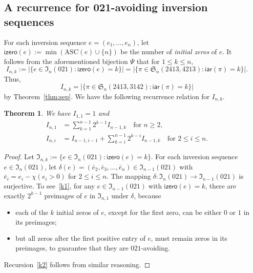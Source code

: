\documentclass[12pt]{amsart}
\numberwithin{equation}{section}
\theoremstyle{plain}
\newtheorem{theorem}{Theorem}[section]
\theoremstyle{definition}
\newcommand{\I}{\mathfrak{I}}
\def\S{\mathfrak{S}}
\def\iar{\mathsf{iar}}
\def\ASC{\mathrm{ASC}}
\def\izero{\mathsf{izero}}
\begin{document}
\subsection{A recurrence for 021-avoiding inversion sequences}
\label{sec:021}
For each inversion sequence $e=(e_1,\ldots,e_n)$, let $\izero(e):=\min(\ASC(e)\cup\{n\})$ be the number of {\em initial zeros} of $e$. It follows from the aforementioned bijection $\Psi$ that for $1\leq k\leq n$,
\begin{equation}
I_{n,k}:=|\{e\in\I_n(021):\izero(e)=k\}|=|\{\pi\in\S_n(2413,4213):\iar(\pi)=k\}|.
\end{equation}
Thus, 
$$
I_{n,k}=|\{\pi\in\S_n(2413,3142):\iar(\pi)=k\}|
$$
by Theorem~\ref{thm:sep}. 
We have the following recurrence relation for $I_{n,k}$. 
\begin{theorem} \label{rec:021}We have $I_{1,1}=1$ and 
\begin{align}
\label{k1}I_{n,1}&=\sum_{k=1}^{n-1}2^{k-1}I_{n-1,k}\quad\text{for $n\geq2$},\\
\label{k2}I_{n,i}&=I_{n-1,i-1}+\sum_{k=i}^{n-1}2^{k-i}I_{n-1,k}\quad\text{for $2\leq i \leq n$}.
\end{align}
\end{theorem}
\begin{proof}
Let $\I_{n,k}:=\{e\in\I_n(021):\izero(e)=k\}$.
For each inversion sequence $e\in\I_n(021)$, let $\delta(e)=(\bar e_2,\bar e_3,\ldots,\bar e_n)\in\I_{n-1}(021)$ with $\bar e_i=e_i-\chi(e_i>0)$ for $2\leq i\leq n$. The mapping $\delta:\I_n(021)\rightarrow\I_{n-1}(021)$ is surjective. To see~\eqref{k1}, for any $e\in\I_{n-1}(021)$ with $\izero(e)=k$, there are exactly $2^{k-1}$ preimages of $e$ in $\I_{n,1}$ under $\delta$, because 
\begin{itemize}
\item each of the $k$ initial zeros of $e$, except for the first zero, can be either $0$ or $1$ in its preimages;
\item but all zeros after the first positive entry of $e$, must remain zeros in its preimages, to guarantee that they are $021$-avoiding. 
\end{itemize}
Recursion~\eqref{k2} follows from similar reasoning. 
\end{proof}

 
\end{document}
